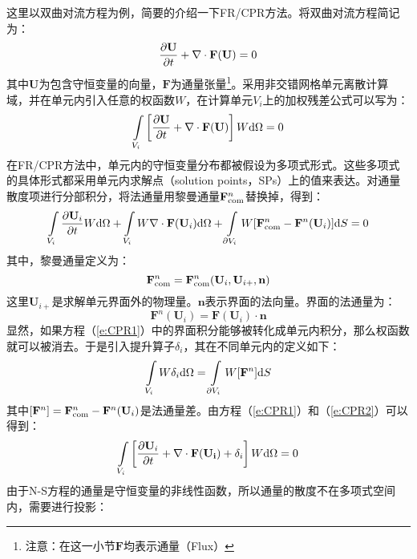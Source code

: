 这里以双曲对流方程为例，简要的介绍一下FR/CPR方法。将双曲对流方程简记为：
\begin{equation}\label{e:hyperbolic}
  \frac{\partial \mathbf{U}}{\partial t} + \nabla \cdot \mathbf{F}(\mathbf{U}) = 0
\end{equation}
其中$\mathbf{U}$为包含守恒变量的向量，$\mathbf{F}$为通量张量\footnote{注意：在这一小节$\mathbf{F}$均表示通量（Flux）}。采用非交错网格单元离散计算域，并在单元内引入任意的权函数$W$，在计算单元$V_i$上的加权残差公式可以写为：
\begin{equation}\label{e:wresidual}
  \int\limits_{V_i}\left[ \frac{\partial \mathbf{U}}{\partial t} + \nabla \cdot \mathbf{F}(\mathbf{U})  \right]W{\rm d}\Omega=0
\end{equation}
在FR/CPR方法中，单元内的守恒变量分布都被假设为多项式形式。这些多项式的具体形式都采用单元内求解点（solution points，SPs）上的值来表达。对通量散度项进行分部积分，将法通量用黎曼通量$\mathbf{F}_{\rm com}^n$替换掉，得到：
\begin{equation}\label{e:CPR1}
  \int\limits_{V_i}\frac{\partial \mathbf{U}_i}{\partial t}W{\rm d}\Omega
  + \int\limits_{V_i}W \nabla \cdot \mathbf{F}(\mathbf{U}_i) {\rm d}\Omega
  + \int\limits_{\partial V_i}W [\mathbf{F}_{\rm com}^n - \mathbf{F}^n(\mathbf{U}_i)] {\rm d}S
  =0
\end{equation}
其中，黎曼通量定义为：
\begin{equation}
  \mathbf{F}_{\rm com}^n = \mathbf{F}_{\rm com}^n(\mathbf{U}_i,\mathbf{U}_{i+},\mathbf{n})
\end{equation}
这里$\mathbf{U}_{i+}$是求解单元界面外的物理量。$\mathbf{n}$表示界面的法向量。界面的法通量为：
\begin{equation}
  \mathbf{F}^n(\mathbf{U}_i)=\mathbf{F}(\mathbf{U}_i) \cdot \mathbf{n}
\end{equation}
显然，如果方程（\ref{e:CPR1}）中的界面积分能够被转化成单元内积分，那么权函数就可以被消去。于是引入提升算子$\delta_i$，其在不同单元内的定义如下：
\begin{equation}\label{e:CPR2}
  \int\limits_{V_i}W\delta_i{\rm d}\Omega = \int\limits_{\partial V_i}W [\mathbf{F}^n] {\rm d}S
\end{equation}
其中$[\mathbf{F}^n]=\mathbf{F}_{\rm com}^n - \mathbf{F}^n(\mathbf{U}_i)$是法通量差。由方程（\ref{e:CPR1}）和（\ref{e:CPR2}）可以得到：
\begin{equation}\label{}
  \int\limits_{V_i}\left[ \frac{\partial \mathbf{U}_i}{\partial t} + \nabla \cdot \mathbf{F}(\mathbf{U_i})  + \delta_i\right]W{\rm d}\Omega=0
\end{equation}
由于N-S方程的通量是守恒变量的非线性函数，所以通量的散度不在多项式空间内，需要进行投影：
